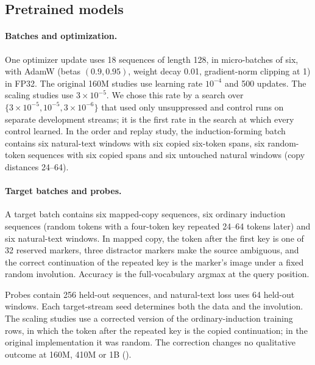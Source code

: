 \subsection{Pretrained models}
\label{app:pythiamethods}
\paragraph{Batches and optimization.}
One optimizer update uses 18 sequences of length 128, in micro-batches of six,
with AdamW (betas $(0.9,0.95)$, weight decay 0.01, gradient-norm clipping at 1) in
FP32. The original 160M studies use learning rate $10^{-4}$ and 500 updates. The
scaling studies use $3\times10^{-5}$. We chose this rate by a search over
$\{3\times10^{-5},10^{-5},3\times10^{-6}\}$ that used only unsuppressed and control
runs on separate development streams; it is the first rate in the search at which
every control learned. In the order and replay study, the induction-forming batch
contains six natural-text windows with six copied six-token spans, six random-token
sequences with six copied spans and six untouched natural windows (copy distances
24--64).

\paragraph{Target batches and probes.}
A target batch contains six mapped-copy sequences, six ordinary induction
sequences (random tokens with a four-token key repeated 24--64 tokens later) and
six natural-text windows. In mapped copy, the token after the first key is one of
32 reserved markers, three distractor markers make the source ambiguous, and the
correct continuation of the repeated key is the marker's image under a fixed random
involution. Accuracy is the full-vocabulary argmax at the query position.

Probes contain 256 held-out sequences, and natural-text loss uses 64 held-out
windows. Each target-stream seed determines both the data and the involution. The
scaling studies use a corrected version of the ordinary-induction training rows, in
which the token after the repeated key is the copied continuation; in the original
implementation it was random. The correction changes no qualitative outcome at 160M, 410M
or 1B ().

